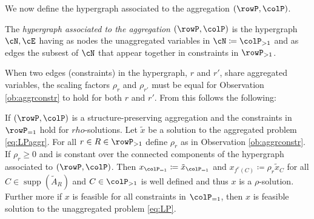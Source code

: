 \documentclass[smallextended,natbib]{svjour3}       %
\DeclareMathOperator{\supp}{supp}
\numberwithin{definition}{section}
\numberwithin{theorem}{section}
\numberwithin{proposition}{section}
\begin{document}
We now define the hypergraph associated to the aggregation \((\rowP, \colP)\).
\begin{definition}
  The \emph{hypergraph associated to the aggregation \((\rowP, \colP)\)} is the hypergraph \(\cN, \cE\) having as nodes the unaggregated variables in  \(\cN \coloneqq \colP_{>1}\) and as edges the subsest of \(\cN\) that appear together in constraints in \(\rowP_{>1}\).
\end{definition}

When two edges (constraints) in the hypergraph, \(r\) and \(r'\), share aggregated variables, 
the scaling factors \(\rho_r\) and \(\rho_{r'}\) must be equal for Observation \ref{ob:aggrconstr} to hold for both \(r\) and \(r'\). 
From this follows the following:
\begin{proposition}
\label{prop:xaggfeasible}
If \((\rowP, \colP)\) is a structure-preserving aggregation and the constraints in \(\rowP_{=1}\) hold for \(rho\)-solutions. Let \(\tilde{x}\) be a solution 
to the aggregated problem \eqref{eq:LPaggr}. For all \(r \in R \in \rowP_{>1}\) define \(\rho_r\) as in Observation \ref{ob:aggrconstr}. If \(\rho_r \geq 0\) and is constant over the connected components of the hypergraph associated to \((\rowP, \colP)\). 
Then \(x_{\colP_{=1}} \coloneqq \tilde{x}_{\colP_{=1}}\) and \(x_{f^r(C)} \coloneqq \rho_r \tilde{x}_C\) for all \(C \in \supp(\tilde{A}_R)\) and \(C \in \colP_{>1}\) is well defined and thus \(x\) is a \(\rho\)-solution.
Further more if \(x\) is feasible for all constraints in \(\colP_{=1}\), then \(x\) is feasible solution to the unaggregated problem \eqref{eq:LP}.
\end{proposition}
\end{document}
